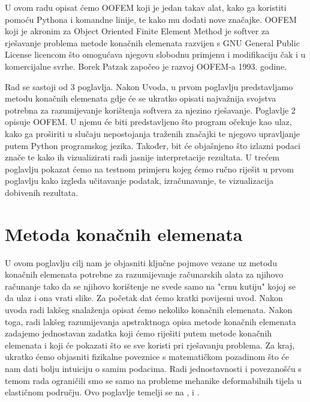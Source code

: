 \documentclass[a4paper,twoside,12pt]{memoir} %
\begin{document}
\begin{intro}
U ovom radu opisat ćemo OOFEM koji je jedan takav alat, kako ga koristiti pomoću Pythona i komandne linije, te kako mu dodati nove značajke. OOFEM koji je akronim za Object Oriented Finite Element Method je softver za rješavanje problema metode konačnih elemenata razvijen s GNU General Public License licencom što omogućava njegovu slobodnu primjenu i modifikaciju čak i u komercijalne svrhe. Borek Patzak započeo je razvoj OOFEM-a 1993. godine. \par

Rad se sastoji od 3 poglavlja. Nakon Uvoda, u prvom poglavlju predstavljamo metodu konačnih elemenata gdje će se ukratko opisati najvažnija svojstva potrebna za razumijevanje korištenja softvera za njezino rješavanje. Poglavlje 2 opisuje OOFEM. U njemu će biti predstavljeno što program očekuje kao ulaz, kako ga proširiti u slučaju nepostojanja traženih značajki te njegovo upravljanje putem Python programskog jezika. Također, bit će objašnjeno što izlazni podaci znače te kako ih vizualizirati radi jasnije interpretacije rezultata. U trećem poglavlju pokazat ćemo na testnom primjeru kojeg ćemo ručno riješit u prvom poglavlju kako izgleda učitavanje podatak, izračunavanje, te vizualizacija dobivenih rezultata.

\end{intro}


\chapter{Metoda konačnih elemenata}	
U ovom poglavlju cilj nam je objasniti ključne pojmove vezane uz metodu konačnih elemenata potrebne za razumijevanje računarskih alata za njihovo računanje tako da se njihovo korištenje ne svede samo na "crnu kutiju" kojoj se da ulaz i ona vrati slike. Za početak dat ćemo kratki povijesni uvod. Nakon uvoda radi lakšeg snalaženja opisat ćemo nekoliko konačnih elemenata. Nakon toga, radi lakšeg razumijevanja apstraktnoga opisa metode konačnih elemenata zadajemo jednostavan zadatka koji ćemo riješiti putem metode konačnih elemenata i koji će pokazati što se sve koristi pri rješavanju problema. Za kraj, ukratko ćemo objasniti fizikalne poveznice s matematičkom pozadinom što će nam dati bolju intuiciju o samim podacima. Radi jednostavnosti i povezanošću s temom rada ograničili smo se samo na probleme mehanike deformabilnih tijela u elastičnom području. Ovo poglavlje temelji se na \cite{jurica_soric}, \cite{coursera} i \cite{wiki_fem_18}.
\end{document}
